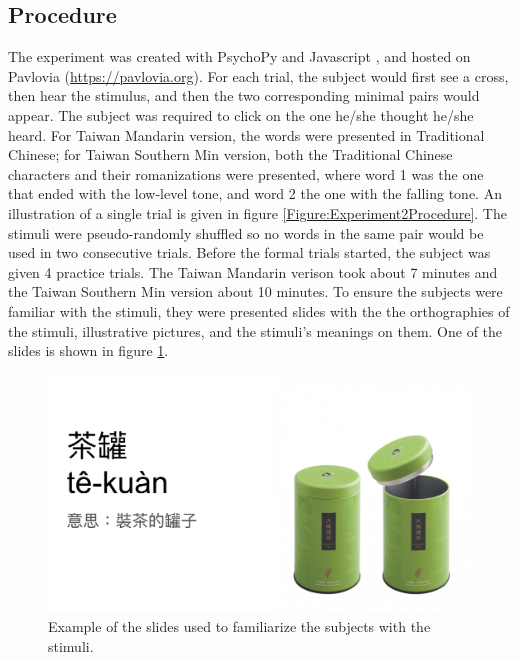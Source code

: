 \documentclass[12pt]{report}
\begin{document}
\begin{CJK}{UTF8}{bsmi}
\subsection{Procedure}
The experiment was created with PsychoPy \citep{Peirce2019} and Javascript \citep{Flanagan2006}, and hosted on Pavlovia (\url{https://pavlovia.org}). For each trial, the subject would first see a cross, then hear the stimulus, and then the two corresponding minimal pairs would appear. The subject was required to click on the one he/she thought he/she heard. For Taiwan Mandarin version, the words were presented in Traditional Chinese; for Taiwan Southern Min version, both the Traditional Chinese characters and their romanizations were presented, where word 1 was the one that ended with the low-level tone, and word 2 the one with the falling tone. An illustration of a single trial is given in figure  \ref{Figure:Experiment2Procedure}. The stimuli were pseudo-randomly shuffled so no words in the same pair would be used in two consecutive trials. Before the formal trials started, the subject was given 4 practice trials. The Taiwan Mandarin verison took about 7 minutes and the Taiwan Southern Min version about 10 minutes. To ensure the subjects were familiar with the stimuli, they were presented slides with the the orthographies of the stimuli, illustrative pictures, and the stimuli's meanings on them. One of the slides is shown in figure \ref{Figure:Experiment2SlideExample}.

\begin{figure}[h]
\centering
\includegraphics[scale=.2]{Figures/E2/SlideExample.jpg}
\caption{Example of the slides used to familiarize the subjects with the stimuli.}
\label{Figure:Experiment2SlideExample}
\end{figure}



\end{CJK}
\end{document}
